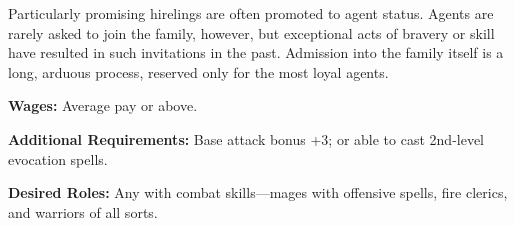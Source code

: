Particularly promising hirelings are often promoted to agent status. Agents are rarely asked to join the family, however, but exceptional acts of bravery or skill have resulted in such invitations in the past. Admission into the family itself is a long, arduous process, reserved only for the most loyal agents.

\textbf{Wages:} Average pay or above.

\textbf{Additional Requirements:} Base attack bonus +3; or able to cast 2nd-level evocation spells.

\textbf{Desired Roles:} Any with combat skills---mages with offensive spells, fire clerics, and warriors of all sorts.